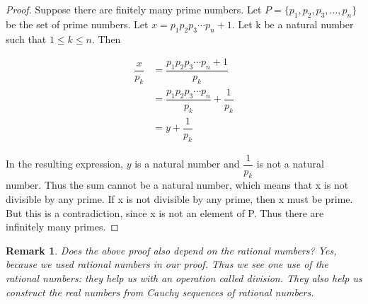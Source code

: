 \documentclass{article}
\newtheorem{remark}{Remark}
\begin{document}
\begin{proof}
Suppose there are finitely many prime numbers. Let $P = \{p_{1}, p_{2}, p_{3}, ... ,p_{n}\}$ be the set of prime numbers. Let $x = p_{1}p_{2}p_{3} \dotsm p_{n} + 1$. Let k be a natural number such that $1 \leq k \leq n$. Then 

\begin{align*}
\dfrac{x}{p_{k}} &= \dfrac{p_{1}p_{2}p_{3} \dotsm p_{n} + 1}{p_{k}} \\
&= \dfrac{p_{1}p_{2}p_{3} \dotsm p_{n}}{p_{k}} + \dfrac{1}{p_{k}} \\
&= y + \dfrac{1}{p_{k}}
\end{align*}

In the resulting expression, $y$ is a natural number and $\dfrac{1}{p_{k}}$ is not a natural number. Thus the sum cannot be a natural number, which means that x is not divisible by any prime. If x is not divisible by any prime, then x must be prime. But this is a contradiction, since x is not an element of P. Thus there are infinitely many primes. 
\end{proof}

\begin{remark}
Does the above proof also depend on the rational numbers? Yes, because we used rational numbers in our proof. Thus we see one use of the rational numbers: they help us with an operation called division. They also help us construct the real numbers from Cauchy sequences of rational numbers.
\end{remark}
\end{document}
